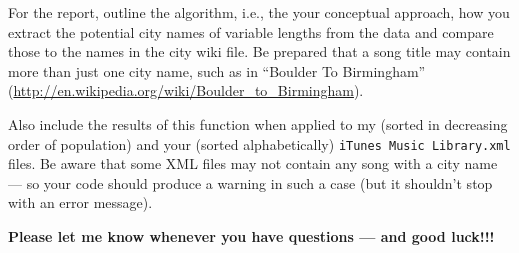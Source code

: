 \documentclass[11pt]{article}
\begin{document}
\begin{enumerate}
For the report, outline the algorithm, i.e., the your conceptual approach, how you
extract the potential city names of variable lengths from the data and compare
those to the names in the city wiki file. Be prepared that a song title 
may contain more than just one city name, such as in ``Boulder To Birmingham''
(\url{http://en.wikipedia.org/wiki/Boulder_to_Birmingham}).

Also include the results of this function when
applied to my (sorted in decreasing order of population) and your (sorted alphabetically)
{\tt iTunes Music Library.xml} files.
Be aware that some XML files may not contain any song with a city name ---
so your code should produce a warning in such a case (but it shouldn't
stop with an error message).


\end{enumerate}


{\large \bf Please let me know whenever you have questions --- and good luck!!!}
\end{document}
